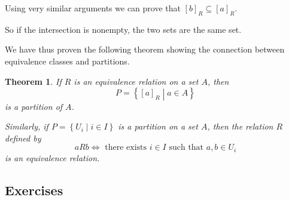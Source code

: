 \documentclass[
]{book}
\newtheorem{theorem}{Theorem}[chapter]
\theoremstyle{definition}
\theoremstyle{definition}
\theoremstyle{definition}
\theoremstyle{definition}
\theoremstyle{remark}
\begin{document}
Using very similar arguments we can prove that \([b]_R \subseteq [a]_R\).

So if the intersection is nonempty, the two sets are the same set.

We have thus proven the following theorem showing the connection between equivalence classes and partitions.

\begin{theorem}
If \(R\) is an equivalence relation on a set \(A\), then \[P = \left\{ [a]_R \middle \vert a \in A\right\}\] is a partition of \(A\).

Similarly, if \(P= \left\{ U_i \middle \vert i \in I\right\}\) is a partition on a set \(A\), then the relation \(R\) defined by
\[aRb \Leftrightarrow \mbox{ there exists } i \in I \mbox{ such that } a,b \in U_i\] is an equivalence relation.
\end{theorem}

\hypertarget{exercises-6}{%
\subsection{Exercises}\label{exercises-6}}
\end{document}
